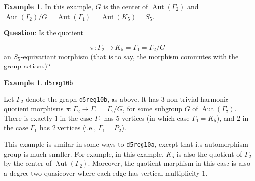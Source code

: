 \documentclass[12pt,letterpaper]{article}
\theoremstyle{definition}
\newtheorem{example}[theorem]{Example}
\DeclareMathOperator{\Aut}{Aut}
\begin{document}
\begin{example}
{In this example, $G$ is the center of $\Aut(\Gamma_2)$ and
$\Aut(\Gamma_2)/G=\Aut(\Gamma_1)=\Aut(K_5)=S_5$.

\noindent
{\bf Question}:
Is the quotient

\[
\pi: \Gamma_2 \to K_5=\Gamma_1=\Gamma_2/G
\]
an $S_5$-equivariant morphism (that is to say, the morphism commutes with the
group actions)?


}
\end{example}


\begin{example}%
\label{example:d5reg10b}
  {\tt d5reg10b}\newline
{\rm  
  Let $\Gamma_2$ denote the graph {\tt d5reg10b}, as above.
It has $3$  non-trivial harmonic quotient morphisms
$\pi: \Gamma_2\to \Gamma_1=\Gamma_2/G$,
for some subgroup $G$ of $\Aut(\Gamma_2)$.
There is exactly $1$ in the case $\Gamma_1$ has $5$ vertices
(in which case $\Gamma_1=K_5$),
and $2$ in the case $\Gamma_1$ has $2$ vertices
(i.e., $\Gamma_1=P_2$).

This example is similar in some ways to {\tt d5reg10a}, except that
its automorphism group is much smaller. For example, in this
example, $K_5$ is also the quotient of $\Gamma_2$ by the
center of $\Aut(\Gamma_2)$. Moreover, the quotient morphism
in this case is also a degree two quasicover
where each edge has vertical multiplicity $1$.


}
\end{example}
\end{document}
